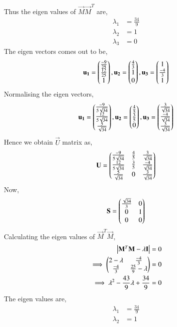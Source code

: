 \documentclass[journal,12pt,twocolumn]{IEEEtran}
\begin{document}
Thus the eigen values of $\vec{M}\vec{M}^T$ are, 
\begin{align}
    \lambda_1 &= \frac{34}{9}\\
    \lambda_2 &= 1 \\
    \lambda_3 &= 0
\end{align}
The eigen vectors comes out to be, 
\begin{align}
    \mathbf{u_1}= \begin{pmatrix}\frac{-9}{25}\\\frac{12}{25}\\1\end{pmatrix}, \mathbf{u_2}=\begin{pmatrix}\frac{4}{3}\\1\\0\end{pmatrix}, 
    \mathbf{u_3}=\begin{pmatrix}1\\\frac{-4}{3}\\1\end{pmatrix}
\end{align}
Normalising the eigen vectors, 
\begin{align}
    \mathbf{u_1}= \begin{pmatrix}\frac{-9}{5\sqrt{34}}\\\frac{12}{5\sqrt{34}}\\\frac{5}{\sqrt{34}}\end{pmatrix}, 
    \mathbf{u_2}=\begin{pmatrix}\frac{4}{5}\\\frac{3}{5}\\0\end{pmatrix}, 
    \mathbf{u_3}=\begin{pmatrix}\frac{3}{\sqrt{34}} \\ \frac{-4}{\sqrt{34}} \\ \frac{3}{\sqrt{34}}\end{pmatrix}
\end{align}
Hence we obtain $\vec{U}$ matrix as, 
\begin{align}
    \mathbf{U}= \begin{pmatrix}\frac{-9}{5\sqrt{34}} & \frac{4}{5} & \frac{3}{\sqrt{34}} \\ \frac{12}{5\sqrt{34}} & \frac{3}{5} & \frac{-4}{\sqrt{34}} \\ \frac{5}{\sqrt{34}} & 0 & \frac{3}{\sqrt{34}}\end{pmatrix}
\end{align}
Now, 
\begin{align}
    \mathbf{S} = \begin{pmatrix}\frac{\sqrt{34}}{3}&0\\0&1\\0&0\end{pmatrix}
\end{align}
Calculating the eigen values of $\vec{M}^T\vec{M}$, 
\begin{align}
    \begin{vmatrix}\mathbf{M}^T\mathbf{M}-\lambda\mathbf{I}\end{vmatrix} &=0 \\
    \implies \begin{pmatrix}2-\lambda&\frac{-4}{3}\\ \frac{-4}{3}&\frac{25}{9}-\lambda\end{pmatrix} &=0 \\
    \implies \lambda^2-\frac{43}{9}\lambda+\frac{34}{9}&=0
\end{align}
The eigen values are, 
\begin{align}
    \lambda_1&= \frac{34}{9}\\
    \lambda_2&= 1
\end{align}
\end{document}
